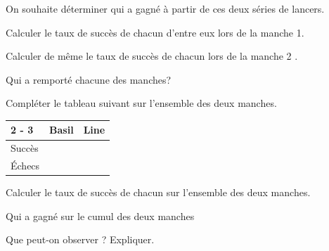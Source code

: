 \documentclass[11pt,a4paper]{article}  %
\begin{document}
On souhaite déterminer qui a gagné à partir de ces deux séries de lancers.
\begin{enumMet}
	\item \begin{enumMet}
		\item Calculer le taux de succès de chacun d'entre eux lors de la manche 1.
		\item Calculer de même le taux de succès de chacun lors de la manche 2 .
		\item Qui a remporté chacune des manches?
	\end{enumMet}
	\item \begin{enumMet}
		\item {} Compléter le tableau suivant sur l'ensemble des deux manches.
		
		\begin{tabular}{|l|l|l|}
			\cline { 2 - 3 } \multicolumn{1}{c|}{} & Basil & Line \\
			\hline Succès & & \\
			\hline Échecs & & \\
			\hline
		\end{tabular}
		\item {} Calculer le taux de succès de chacun sur l'ensemble des deux manches.
		\item {} Qui a gagné sur le cumul des deux manches
	\end{enumMet}
	\item {} Que peut-on observer ? Expliquer.
\end{enumMet}
\end{document}

